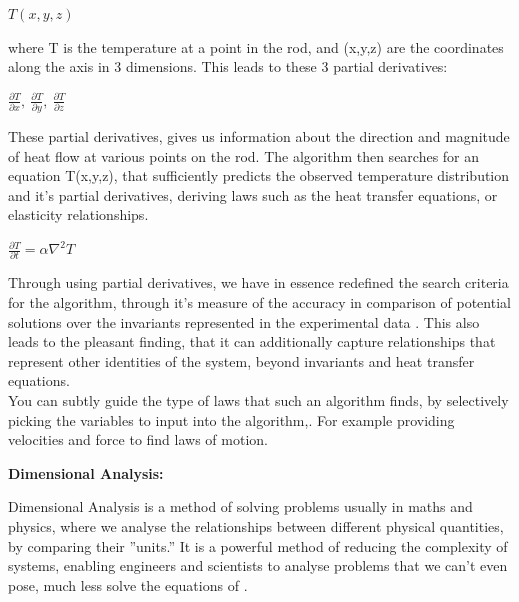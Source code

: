 \documentclass{article}
\begin{document}
\begin{center}
$T(x,y,z)$
\end{center}

where T is the temperature at a point in the rod, and (x,y,z) are the coordinates along the axis in 3 dimensions. This leads to these 3 partial derivatives: \\ 

\begin{center}
 $\frac{\partial T}{\partial x}, \  \frac{\partial T}{\partial y}, \  \frac{\partial T}{\partial z}$
\end{center}

These partial derivatives, gives us information about the direction and magnitude of heat flow at various points on the rod. The algorithm then searches for an equation T(x,y,z), that sufficiently predicts the observed temperature distribution and it's partial derivatives, deriving laws such as the heat transfer equations, or elasticity relationships.\\ 

\begin{center}
$\frac{\partial T}{\partial t} = \alpha \nabla^2 T$
\end{center}



Through using partial derivatives, we have in essence redefined the search criteria for the algorithm, through it's measure of the accuracy in comparison of potential solutions over the invariants represented in the experimental data \cite{Kelly2021} . This also leads to the pleasant finding, that it can additionally capture relationships that represent other identities of the system, beyond invariants and heat transfer equations. \\ 

You can subtly guide the type of laws that such an algorithm finds, by selectively picking the variables to input into the algorithm,. For example providing velocities and force to find laws of motion. \\ 





\begin{center} 
  \textbf {\Large Dimensional Analysis:}
\end{center}

Dimensional Analysis is a method of solving problems usually in maths and physics, where we analyse
the relationships between different physical quantities, by comparing their ”units.” It is a powerful
method of reducing the complexity of systems, enabling engineers and scientists to analyse problems
that we can’t even pose, much less solve the equations of \cite{Longo2021}.\\
\end{document}
